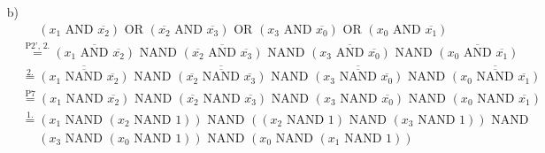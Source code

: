 \documentclass{article}
\def\orr{\text{ OR }}
\def\andd{\text{ AND }}
\def\nor{\text{ NOR }}
\def\nand{\text{ NAND }}
\newcommand{\nyet}{\overline}
\begin{document}
\begin{enumerate}
		\item[b)]
		\begin{align*}
			&\phantom{=} (x_1 \andd \nyet{x_2}) \orr (\nyet{x_2} \andd \nyet{x_3}) \orr (x_3 \andd \nyet{x_0}) \orr (x_0 \andd \nyet{x_1}) \\
			&\stackrel{\text{P2', 2.}}{=} \nyet{(x_1 \andd \nyet{x_2})} \nand \nyet{(\nyet{x_2} \andd \nyet{x_3})} \nand \nyet{(x_3 \andd \nyet{x_0})} \nand \nyet{(x_0 \andd \nyet{x_1})} \\
			&\stackrel{\text{2.}}{=} \nyet{\nyet{(x_1 \nand \nyet{x_2})}} \nand \nyet{\nyet{(\nyet{x_2} \nand \nyet{x_3})}} \nand \nyet{\nyet{(x_3 \nand \nyet{x_0})}} \nand \nyet{\nyet{(x_0 \nand \nyet{x_1})}} \\
			&\stackrel{\text{P7}}{=} (x_1 \nand \nyet{x_2}) \nand (\nyet{x_2} \nand \nyet{x_3}) \nand (x_3 \nand \nyet{x_0}) \nand (x_0 \nand \nyet{x_1}) \\
			&\stackrel{\text{1.}}{=} (x_1 \nand (x_2 \nand 1)) \nand ((x_2 \nand 1) \nand (x_3 \nand 1)) \nand \\ 
			& \phantom{=} (x_3 \nand (x_0 \nand 1)) \nand (x_0 \nand (x_1 \nand 1)) 
		\end{align*} 
	\end{enumerate}
\end{document}
